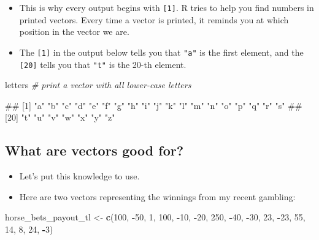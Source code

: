 \documentclass[
]{book}
\newenvironment{Shaded}{\begin{snugshade}}{\end{snugshade}}
\newcommand{\CommentTok}[1]{\textcolor[rgb]{0.56,0.35,0.01}{\textit{#1}}}
\newcommand{\DecValTok}[1]{\textcolor[rgb]{0.00,0.00,0.81}{#1}}
\newcommand{\FunctionTok}[1]{\textcolor[rgb]{0.13,0.29,0.53}{\textbf{#1}}}
\newcommand{\NormalTok}[1]{#1}
\newcommand{\OtherTok}[1]{\textcolor[rgb]{0.56,0.35,0.01}{#1}}
\newcommand{\SpecialCharTok}[1]{\textcolor[rgb]{0.81,0.36,0.00}{\textbf{#1}}}
\providecommand{\tightlist}{%
  \setlength{\itemsep}{0pt}\setlength{\parskip}{0pt}}
\begin{document}
\begin{itemize}
\tightlist
\item
  This is why every output begins with \texttt{{[}1{]}}. R tries to help you find numbers in printed vectors. Every time a vector is printed, it reminds you at which position in the vector we are.
\item
  The \texttt{{[}1{]}} in the output below tells you that \texttt{"a"} is the first element, and the \texttt{{[}20{]}} tells you that \texttt{"t"} is the 20-th element.
\end{itemize}

\begin{Shaded}
\begin{Highlighting}[]
\NormalTok{letters }\CommentTok{\# print a vector with all lower{-}case letters}
\end{Highlighting}
\end{Shaded}

\begin{Shaded}
\begin{Highlighting}[]
\NormalTok{\#\#  [1] "a" "b" "c" "d" "e" "f" "g" "h" "i" "j" "k" "l" "m" "n" "o" "p" "q" "r" "s"}
\NormalTok{\#\# [20] "t" "u" "v" "w" "x" "y" "z"}
\end{Highlighting}
\end{Shaded}

\hypertarget{what-are-vectors-good-for}{%
\subsection{What are vectors good for?}\label{what-are-vectors-good-for}}

\begin{itemize}
\tightlist
\item
  Let's put this knowledge to use.
\item
  Here are two vectors representing the winnings from my recent gambling:
\end{itemize}

\begin{Shaded}
\begin{Highlighting}[]
\NormalTok{horse\_bets\_payout\_tl }\OtherTok{\textless{}{-}} \FunctionTok{c}\NormalTok{(}\DecValTok{100}\NormalTok{, }\SpecialCharTok{{-}}\DecValTok{50}\NormalTok{, }\DecValTok{1}\NormalTok{, }\DecValTok{100}\NormalTok{, }\SpecialCharTok{{-}}\DecValTok{10}\NormalTok{, }\SpecialCharTok{{-}}\DecValTok{20}\NormalTok{, }\DecValTok{250}\NormalTok{, }\SpecialCharTok{{-}}\DecValTok{40}\NormalTok{, }\SpecialCharTok{{-}}\DecValTok{30}\NormalTok{, }\DecValTok{23}\NormalTok{, }\SpecialCharTok{{-}}\DecValTok{23}\NormalTok{, }\DecValTok{55}\NormalTok{, }\DecValTok{14}\NormalTok{, }\DecValTok{8}\NormalTok{, }\DecValTok{24}\NormalTok{, }\SpecialCharTok{{-}}\DecValTok{3}\NormalTok{)}
\end{Highlighting}
\end{Shaded}
\end{document}
